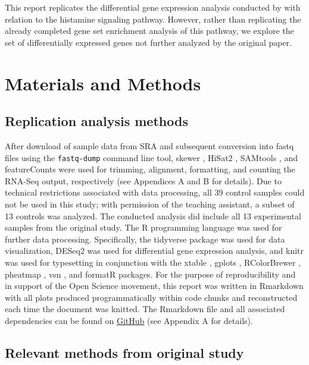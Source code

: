 This report replicates the differential gene expression analysis
conducted by \citet{orig-paper} with relation to the histamine signaling
pathway. However, rather than replicating the already completed gene set
enrichment analysis of this pathway, we explore the set of
differentially expressed genes not further analyzed by the original
paper.

\section{Materials and Methods}\label{materials-and-methods}

\subsection{Replication analysis
methods}\label{replication-analysis-methods}

After download of sample data from SRA and subsequent conversion into
fastq files using the \texttt{fastq-dump} command line tool, skewer
\citep{skewer}, HiSat2 \citep{hisat}, SAMtools \citep{samtools}, and
featureCounts \citep{featurecounts} were used for trimming, alignment,
formatting, and counting the RNA-Seq output, respectively (see
Appendices A and B for details). Due to technical restrictions
associated with data processing, all 39 control samples could not be
used in this study; with permission of the teaching assistant, a subset
of 13 controls was analyzed. The conducted analysis did include all 13
experimental samples from the original study. The R programming language
\citep{R} was used for further data processing. Specifically, the
tidyverse package \citep{tidyverse} was used for data visualization,
DESeq2 \citep{deseq} was used for differential gene expression analysis,
and knitr \citep{knitr3,knitr2,knitr1} was used for typesetting in
conjunction with the xtable \citep{xtable}, gplots \citep{gplots},
RColorBrewer \citep{rcolorbrewer}, pheatmap \citep{pheatmap}, vsn
\citep{vsn}, and formatR \citep{formatr} packages. For the purpose of
reproducibility and in support of the Open Science movement, this report
was written in Rmarkdown with all plots produced programmatically within
code chunks and reconstructed each time the document was knitted. The
Rmarkdown file and all associated dependencies can be found on
\href{https://github.com/rrrlw/RNASeq-ASD}{GitHub} (see Appendix A for
details).

\subsection{Relevant methods from original
study}\label{relevant-methods-from-original-study}

